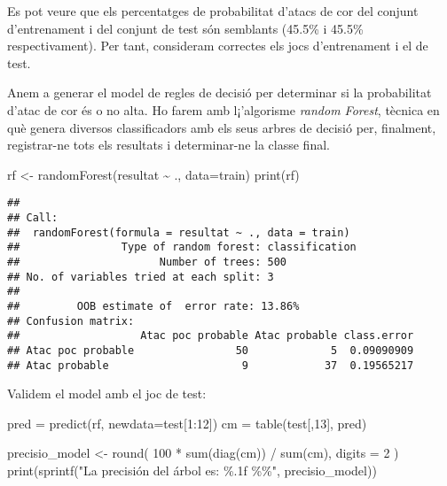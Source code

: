 \documentclass[
]{article}
\newenvironment{Shaded}{\begin{snugshade}}{\end{snugshade}}
\newcommand{\AttributeTok}[1]{\textcolor[rgb]{0.80,0.80,0.80}{#1}}
\newcommand{\DecValTok}[1]{\textcolor[rgb]{0.86,0.86,0.80}{#1}}
\newcommand{\FunctionTok}[1]{\textcolor[rgb]{0.94,0.94,0.56}{#1}}
\newcommand{\NormalTok}[1]{\textcolor[rgb]{0.80,0.80,0.80}{#1}}
\newcommand{\OtherTok}[1]{\textcolor[rgb]{0.94,0.94,0.56}{#1}}
\newcommand{\SpecialCharTok}[1]{\textcolor[rgb]{0.86,0.64,0.64}{#1}}
\newcommand{\StringTok}[1]{\textcolor[rgb]{0.80,0.58,0.58}{#1}}
\begin{document}
Es pot veure que els percentatges de probabilitat d'atacs de cor del
conjunt d'entrenament i del conjunt de test són semblants (45.5\% i
45.5\% respectivament). Per tant, consideram correctes els jocs
d'entrenament i el de test.

Anem a generar el model de regles de decisió per determinar si la
probabilitat d'atac de cor és o no alta. Ho farem amb l¡'algorisme
\emph{random Forest}, tècnica en què genera diversos classificadors amb
els seus arbres de decisió per, finalment, registrar-ne tots els
resultats i determinar-ne la classe final.

\begin{Shaded}
\begin{Highlighting}[]
\NormalTok{rf }\OtherTok{\textless{}{-}} \FunctionTok{randomForest}\NormalTok{(resultat }\SpecialCharTok{\textasciitilde{}}\NormalTok{ ., }\AttributeTok{data=}\NormalTok{train)}
\FunctionTok{print}\NormalTok{(rf)}
\end{Highlighting}
\end{Shaded}

\begin{verbatim}
## 
## Call:
##  randomForest(formula = resultat ~ ., data = train) 
##                Type of random forest: classification
##                      Number of trees: 500
## No. of variables tried at each split: 3
## 
##         OOB estimate of  error rate: 13.86%
## Confusion matrix:
##                   Atac poc probable Atac probable class.error
## Atac poc probable                50             5  0.09090909
## Atac probable                     9            37  0.19565217
\end{verbatim}

Validem el model amb el joc de test:

\begin{Shaded}
\begin{Highlighting}[]
\NormalTok{pred }\OtherTok{=} \FunctionTok{predict}\NormalTok{(rf, }\AttributeTok{newdata=}\NormalTok{test[}\DecValTok{1}\SpecialCharTok{:}\DecValTok{12}\NormalTok{])}
\NormalTok{cm }\OtherTok{=} \FunctionTok{table}\NormalTok{(test[,}\DecValTok{13}\NormalTok{], pred)}

\NormalTok{precisio\_model }\OtherTok{\textless{}{-}} \FunctionTok{round}\NormalTok{( }\DecValTok{100} \SpecialCharTok{*} \FunctionTok{sum}\NormalTok{(}\FunctionTok{diag}\NormalTok{(cm)) }\SpecialCharTok{/} \FunctionTok{sum}\NormalTok{(cm), }\AttributeTok{digits =} \DecValTok{2}\NormalTok{ )}
\FunctionTok{print}\NormalTok{(}\FunctionTok{sprintf}\NormalTok{(}\StringTok{"La precisión del árbol es: \%.1f \%\%"}\NormalTok{, precisio\_model))}
\end{Highlighting}
\end{Shaded}
\end{document}
